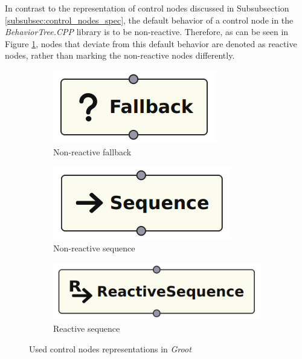In contrast to the representation of control nodes discussed in Subsubsection \ref{subsubsec:control_nodes_spec}, the default behavior of a control node in the \textit{BehaviorTree.CPP} library is to be non-reactive. Therefore,  as can be seen in Figure \ref{fig:control_nodes_impl}, nodes that deviate from this default behavior are denoted as reactive nodes, rather than marking the non-reactive nodes differently.

\begin{figure}[!h]
    \centering
    \begin{subfigure}[b]{.32\linewidth}
        \centering
        \includegraphics[width=0.52\linewidth]{images/implementation/FallbackNode.png}
        \caption{Non-reactive fallback}
    \end{subfigure}
    \hfill
    \begin{subfigure}[b]{.32\linewidth}
        \centering
        \includegraphics[width=0.57\linewidth]{images/implementation/SequenceNode.png}
        \caption{Non-reactive sequence}
    \end{subfigure}
    \hfill
    \begin{subfigure}[b]{.32\linewidth}
        \centering
        \includegraphics[width=0.8\linewidth]{images/implementation/ReactiveSequenceNode.png}
        \caption{Reactive sequence}
    \end{subfigure}
    \caption{Used control nodes representations in \textit{Groot}}
    \label{fig:control_nodes_impl}
\end{figure}

